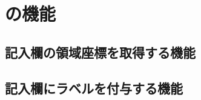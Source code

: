 \chapter{\toolName の機能}\label{cha:Function}



\section{記入欄の領域座標を取得する機能}\label{sec:area_coords_obtainment}


\section{記入欄にラベルを付与する機能}\label{sec:label_link}